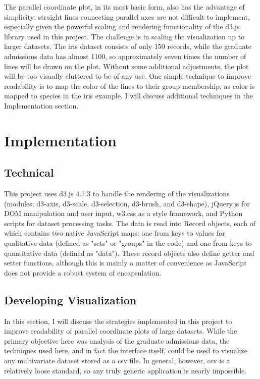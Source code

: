 \documentclass[]{article}
\begin{document}
	\par The parallel coordinate plot, in its most basic form, also has the advantage of simplicity: straight lines connecting parallel axes are not difficult to implement, especially given the powerful scaling and rendering functionality of the d3.js library\cite{d3} used in this project. The challenge is in scaling the visualization up to larger datasets. The iris dataset consists of only 150 records, while the graduate admissions data has almost 1100, so approximately seven times the number of lines will be drawn on the plot. Without some additional adjustments, the plot will be too visually cluttered to be of any use. One simple technique to improve readability is to map the color of the lines to their group membership, as color is mapped to species in the iris example. I will discuss additional techniques in the Implementation section.
	
\section{Implementation}
	\subsection{Technical}
	This project uses d3.js 4.7.3 to handle the rendering of the visualizations (modules: d3-axis, d3-scale, d3-selection, d3-brush, and d3-shape), jQuery.js for DOM manipulation and user input, w3.css as a style framework, and Python scripts for dataset processing tasks. The data is read into Record objects, each of which contains two native JavaScript maps: one from keys to values for qualitative data (defined as "sets" or "groups" in the code) and one from keys to quantitative data (defined as "data"). These record objects also define getter and setter functions, although this is mainly a matter of convenience as JavaScript does not provide a robust system of encapsulation.

	\subsection{Developing Visualization}
		\par In this section, I will discuss the strategies implemented in this project to improve readability of parallel coordinate plots of large datasets. While the primary objective here was analysis of the graduate admissions data, the techniques used here, and in fact the interface itself, could be used to visualize any multivariate dataset stored as a csv file. In general, however, csv is a relatively loose standard\cite{csv}, so any truly generic application is nearly impossible.
\end{document}
